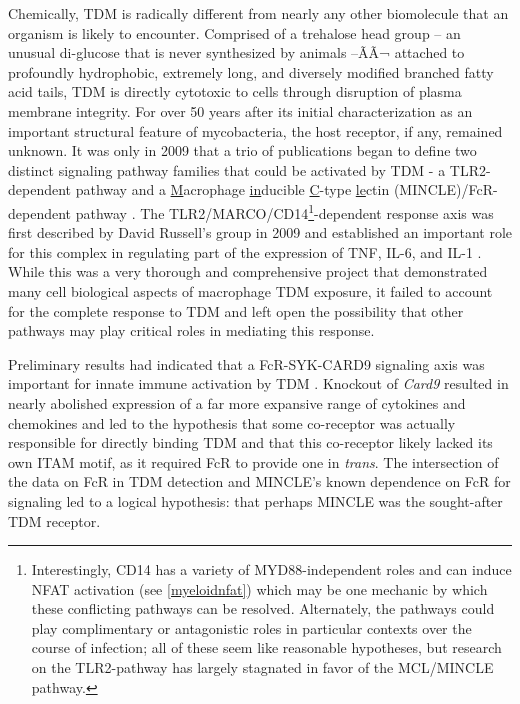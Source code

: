 Chemically, TDM is radically different from nearly any other biomolecule that an organism is likely to encounter. Comprised of a trehalose head group -- an unusual di-glucose that is never synthesized by animals \citep{Elbein2003} --ÃÃ¬ attached to profoundly hydrophobic, extremely long, and diversely modified branched fatty acid tails, TDM is directly cytotoxic to cells through disruption of plasma membrane integrity. For over 50 years after its initial characterization as an important structural feature of mycobacteria, the host receptor, if any, remained unknown. It was only in 2009 that a trio of publications began to define two distinct signaling pathway families that could be activated by TDM - a TLR2-dependent pathway and a \underline{M}acrophage \underline{in}ducible \underline{C}-type \underline{le}ctin (MINCLE)/Fc\textgamma R-dependent pathway \citep{Werninghaus2009, Ishikawa2009, Bowdish2009}. The TLR2/MARCO/CD14\footnote{Interestingly, CD14 has a variety of MYD88-independent roles and can induce NFAT activation (see \autoref{myeloidnfat}) which may be one mechanic by which these conflicting pathways can be resolved. Alternately, the pathways could play complimentary or antagonistic roles in particular contexts over the course of infection; all of these seem like reasonable hypotheses, but research on the TLR2-pathway has largely stagnated in favor of the MCL/MINCLE pathway.}-dependent response axis was first described by David Russell's group in 2009 and established an important role for this complex in regulating part of the expression of TNF\textalpha, IL-6, and IL-1\textbeta{} \citep{Bowdish2009}. While this was a very thorough and comprehensive project that demonstrated many cell biological aspects of macrophage TDM exposure, it failed to account for the complete response to TDM and left open the possibility that other pathways may play critical roles in mediating this response. 

Preliminary results had indicated that a Fc\textgamma R-SYK-CARD9 signaling axis was important for innate immune activation by TDM \citep{Werninghaus2009}. Knockout of \textit{Card9} resulted in nearly abolished expression of a far more expansive range of cytokines and chemokines and led to the hypothesis that some co-receptor was actually responsible for directly binding TDM and that this co-receptor likely lacked its own ITAM motif, as it required Fc\textgamma R to provide one in \textit{trans}. The intersection of the data on Fc\textgamma R in TDM detection \citep{Werninghaus2009} and MINCLE's known dependence on Fc\textgamma R for signaling \citep{Yamasaki2008} led to a logical hypothesis: that perhaps MINCLE was the sought-after TDM receptor.


